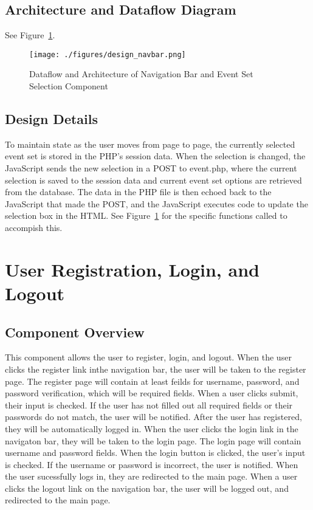 \subsection{ Architecture and Dataflow Diagram}
See Figure~\ref{design_navbar}.
\begin{figure}[tbh]
\begin{center}
\texttt{[image: ./figures/design\_navbar.png]}
\end{center}
\caption{Dataflow and Architecture of Navigation Bar and Event Set Selection Component \label{design_navbar}}
\end{figure} 

\subsection{Design Details}
To maintain state as the user moves from page to page, the currently selected event set is stored in the PHP's session data. When the selection is changed, the JavaScript sends the new selection in a POST to event.php, where the current selection is saved to the session data and current event set options are retrieved from the database.  The data in the PHP file is then echoed back to the JavaScript that made the POST, and the JavaScript executes code to update the selection box in the HTML. See Figure~\ref{design_navbar} for the specific functions called to accompish this. 

\section{User Registration, Login, and Logout}

\subsection{Component  Overview}
This component allows the user to register, login, and logout. When the user clicks the register link inthe navigation bar, the user will be taken to the register page. The register page will contain at least feilds for username, password, and password verification, which will be required fields. When a user clicks submit, their input is checked. If the user has not filled out all required fields or their passwords do not match, the user will be notified. After the user has registered, they will be automatically logged in. When the user clicks the login link in the navigaton bar, they will be taken to the login page. The login page will contain username and password fields. When the login button is clicked, the user's input is checked. If the username or password is incorrect, the user is notified. When the user sucessfully logs in, they are redirected to the main page. When a user clicks the logout link on the navigation bar, the user will be logged out, and redirected to the main page.

